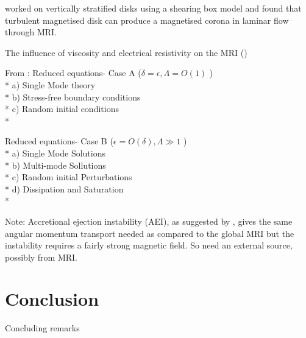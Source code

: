 \documentclass{jfm}
\begin{document}
\cite{Miller1999} worked on vertically stratified disks using a shearing box model and found that turbulent magnetised disk can produce a magnetised corona in laminar flow through MRI.

The influence of viscosity and electrical resistivity on the MRI (\cite{Pessah2008})
  
From \cite{Julien2010}: Reduced equations- Case A ($ \delta = \epsilon, \Lambda = O(1) $ )\\*
 a) Single Mode theory \\*
 b) Stress-free boundary conditions \\*
 c) Random initial conditions \\*
 
 Reduced equations- Case B ($  \epsilon =O( \delta), \Lambda \gg 1 $ ) \\*
 a) Single Mode Solutions \\*
 b) Multi-mode Sollutions \\*
 c) Random initial Perturbations \\*
 d) Dissipation and Saturation \\*
 
Note: Accretional ejection instability (AEI), as suggested by \cite{Caunt2011}, gives the same angular momentum transport needed as compared to the global MRI but the instability requires a fairly strong magnetic field. So need an external source, possibly from MRI.



\section{Conclusion}
Concluding remarks





\end{document}
